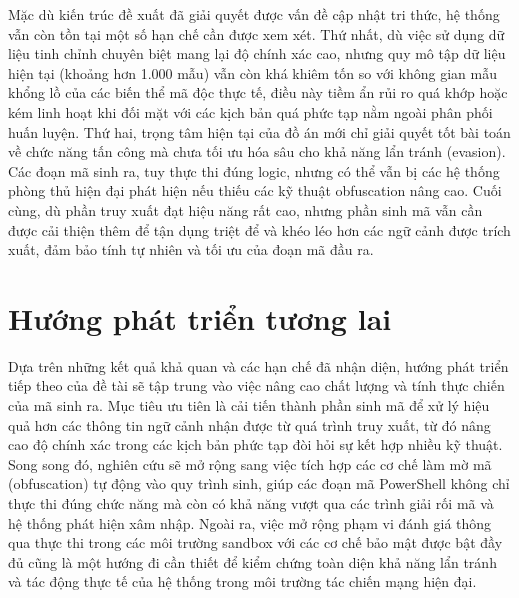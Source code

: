 Mặc dù kiến trúc đề xuất đã giải quyết được vấn đề cập nhật tri thức, hệ thống vẫn còn tồn tại một số hạn chế cần được xem xét. Thứ nhất, dù việc sử dụng dữ liệu tinh chỉnh chuyên biệt mang lại độ chính xác cao, nhưng quy mô tập dữ liệu hiện tại (khoảng hơn 1.000 mẫu) vẫn còn khá khiêm tốn so với không gian mẫu khổng lồ của các biến thể mã độc thực tế, điều này tiềm ẩn rủi ro quá khớp hoặc kém linh hoạt khi đối mặt với các kịch bản quá phức tạp nằm ngoài phân phối huấn luyện. Thứ hai, trọng tâm hiện tại của đồ án mới chỉ giải quyết tốt bài toán về chức năng tấn công mà chưa tối ưu hóa sâu cho khả năng lẩn tránh (evasion). Các đoạn mã sinh ra, tuy thực thi đúng logic, nhưng có thể vẫn bị các hệ thống phòng thủ hiện đại phát hiện nếu thiếu các kỹ thuật obfuscation nâng cao. Cuối cùng, dù phần truy xuất đạt hiệu năng rất cao, nhưng phần sinh mã vẫn cần được cải thiện thêm để tận dụng triệt để và khéo léo hơn các ngữ cảnh được trích xuất, đảm bảo tính tự nhiên và tối ưu của đoạn mã đầu ra.

\section{Hướng phát triển tương lai}

Dựa trên những kết quả khả quan và các hạn chế đã nhận diện, hướng phát triển tiếp theo của đề tài sẽ tập trung vào việc nâng cao chất lượng và tính thực chiến của mã sinh ra. Mục tiêu ưu tiên là cải tiến thành phần sinh mã để xử lý hiệu quả hơn các thông tin ngữ cảnh nhận được từ quá trình truy xuất, từ đó nâng cao độ chính xác trong các kịch bản phức tạp đòi hỏi sự kết hợp nhiều kỹ thuật. Song song đó, nghiên cứu sẽ mở rộng sang việc tích hợp các cơ chế làm mờ mã (obfuscation) tự động vào quy trình sinh, giúp các đoạn mã PowerShell không chỉ thực thi đúng chức năng mà còn có khả năng vượt qua các trình giải rối mã và hệ thống phát hiện xâm nhập. Ngoài ra, việc mở rộng phạm vi đánh giá thông qua thực thi trong các môi trường sandbox với các cơ chế bảo mật được bật đầy đủ cũng là một hướng đi cần thiết để kiểm chứng toàn diện khả năng lẩn tránh và tác động thực tế của hệ thống trong môi trường tác chiến mạng hiện đại.